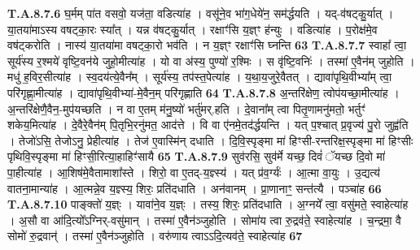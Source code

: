 \documentclass[17pt]{extarticle}
\begin{document}
                                                                  \textbf{ T.A.8.7.6} \newline
                  घ॒र्मम् पा॑त वसवो॒ यज॑ता॒ वडित्या॑ह ।  वसू॑ने॒व भा॑ग॒धेये॑न॒ सम॑र्द्धयति । यद्-व॑षट्कु॒र्यात् । या॒तया॑माऽस्य वषट्का॒रः स्या᳚त् ।  यन्न व॑षट्कु॒र्यात् । रक्षाꣳ॑सि य॒ज्ञ्ꣳ ह॑न्युः । वडित्या॑ह । प॒रोक्ष॑मे॒व वष॑ट्करोति । नास्य॑ या॒तया॑मा वषट्का॒रो भव॑ति ।  न य॒ज्ञ्ꣳ रक्षाꣳ॑सि घ्नन्ति \textbf{ 63} \newline
                  \newline
                                                                  \textbf{ T.A.8.7.7} \newline
                  स्वाहा᳚ त्वा॒ सूर्य॑स्य र॒श्मये॑ वृष्टि॒वन॑ये जुहो॒मीत्या॑ह । यो वा अ॑स्य॒ पुण्यो॑ र॒श्मिः । स वृ॑ष्टि॒वनिः॑ । तस्मा॑ ए॒वैन॑म् जुहोति ।  मधु॑ ह॒विर॒सीत्या॑ह । स्व॒दय॑त्ये॒वैन᳚म् । सूर्य॑स्य॒ तप॑स्त॒पेत्या॑ह ।  य॒था॒य॒जुरे॒वैतत् । द्यावा॑पृथि॒वीभ्या᳚म् त्वा॒ परि॑गृह्णा॒मीत्या॑ह ।  द्यावा॑पृथि॒वीभ्या॑-मे॒वैन॒म् परि॑गृह्णाति \textbf{ 64} \newline
                  \newline
                                                                  \textbf{ T.A.8.7.8} \newline
                  अ॒न्तरि॑क्षेण॒ त्वोप॑यच्छा॒मीत्या॑ह । अ॒न्तरि॑क्षेणै॒वैन॒-मुप॑यच्छति ।  न वा ए॒तम् म॑नु॒ष्यो॑ भर्तु॑मर्.हति ।  दे॒वाना᳚म् त्वा पितृ॒णामनु॑मतो॒ भर्तुꣳ॑ शकेय॒मित्या॑ह । दे॒वैरे॒वैन॑म् पि॒तृभि॒रनु॑मत॒ आद॑त्ते । वि वा ए॑नमे॒तद॑र्द्धयन्ति । यत् प॒श्चात् प्र॒वृज्य॑ पु॒रो जुह्व॑ति । तेजो॑ऽसि॒ तेजोऽनु॒ प्रेहीत्या॑ह । तेज॑ ए॒वास्मि॑न् दधाति । दि॒वि॒स्पृङ्मा मा॑ हिꣳसी-रन्तरिक्ष॒स्पृङ्मा मा॑ हिꣳसीः  पृथिवि॒स्पृङ्मा मा॑ हिꣳसी॒रित्या॒हाहिꣳ॑सायै \textbf{ 65} \newline
                  \newline
                                                                  \textbf{ T.A.8.7.9} \newline
                  सुव॑रसि॒ सुव॑र्मे यच्छ॒ दिवं॑ ॅयच्छ दि॒वो मा॑ पा॒हीत्या॑ह । आ॒शिष॑मे॒वैतामाशा᳚स्ते । शिरो॒ वा ए॒तद्-य॒ज्ञ्स्य॑ । यत् प्र॑व॒र्ग्यः॑ ।  आ॒त्मा वा॒युः । उ॒द्यत्य॑ वातना॒मान्या॑ह ।  आ॒त्मन्ने॒व य॒ज्ञ्स्य॒ शिरः॒ प्रति॑दधाति ।  अन॑वानम् । प्रा॒णानाꣳ॒॒ सन्त॑त्यै । पञ्चा॑ह \textbf{ 66} \newline
                  \newline
                                                                  \textbf{ T.A.8.7.10} \newline
                  पाङ्क्तो॑ य॒ज्ञ्ः । यावा॑ने॒व य॒ज्ञ्ः । तस्य॒ शिरः॒ प्रति॑दधाति । अ॒ग्नये᳚ त्वा॒ वसु॑मते॒ स्वाहेत्या॑ह ।  अ॒सौ वा आ॑दि॒त्यो᳚ऽग्निर्-वसु॑मान् । तस्मा॑ ए॒वैन॑ञ्जुहोति । सोमा॑य त्वा रु॒द्रव॑ते॒ स्वाहेत्या॑ह ।  च॒न्द्रमा॒ वै सोमो॑ रु॒द्रवान्॑ । तस्मा॑ ए॒वैन॑ञ्जुहोति । वरु॑णाय त्वाऽऽदि॒त्यव॑ते॒ स्वाहेत्या॑ह \textbf{ 67} \newline
\end{document}
